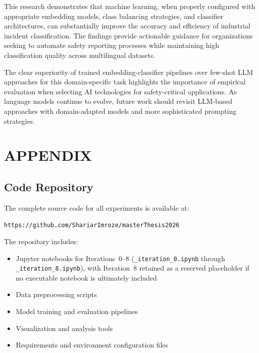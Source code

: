 \documentclass[11pt, titlepage, bibliography=totoc]{scrreprt}
\begin{document}
This research demonstrates that machine learning, when properly configured with appropriate embedding models, class balancing strategies, and classifier architectures, can substantially improve the accuracy and efficiency of industrial incident classification. The findings provide actionable guidance for organizations seeking to automate safety reporting processes while maintaining high classification quality across multilingual datasets.

The clear superiority of trained embedding-classifier pipelines over few-shot LLM approaches for this domain-specific task highlights the importance of empirical evaluation when selecting AI technologies for safety-critical applications. As language models continue to evolve, future work should revisit LLM-based approaches with domain-adapted models and more sophisticated prompting strategies.

\printbibliography

\appendix

\chapter{APPENDIX}

\section{Code Repository}

The complete source code for all experiments is available at:

\begin{center}
\texttt{https://github.com/ShariarImroze/masterThesis2026}
\end{center}

The repository includes:
\begin{itemize}
    \item Jupyter notebooks for Iterations~0--8 (\texttt{\_iteration\_0.ipynb} through \texttt{\_iteration\_8.ipynb}), with Iteration~8 retained as a reserved placeholder if no executable notebook is ultimately included
    \item Data preprocessing scripts
    \item Model training and evaluation pipelines
    \item Visualization and analysis tools
    \item Requirements and environment configuration files
\end{itemize}
\end{document}
